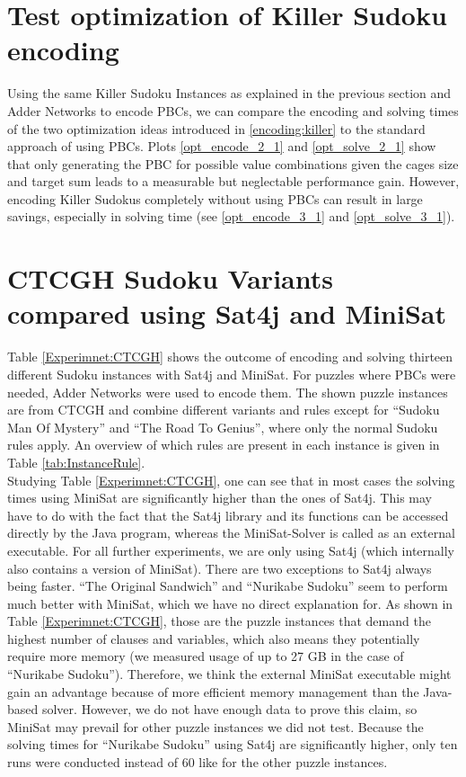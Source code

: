 \section{Test optimization of Killer Sudoku encoding}
Using the same Killer Sudoku Instances as explained in the previous section and Adder Networks to encode PBCs, we can compare the encoding and solving times of the two optimization ideas introduced in \ref{encoding:killer} to the standard approach of using PBCs. Plots \ref{opt_encode_2_1} and \ref{opt_solve_2_1} show that only generating the PBC for possible value combinations given the cages size and target sum leads to a measurable but neglectable performance gain. However, encoding Killer Sudokus completely without using PBCs can result in large savings, especially in solving time (see \ref{opt_encode_3_1} and \ref{opt_solve_3_1}).

\section{CTCGH Sudoku Variants compared using Sat4j and MiniSat}
Table \ref{Experimnet:CTCGH} shows the  outcome of encoding and solving thirteen different Sudoku instances with Sat4j and MiniSat. For puzzles where PBCs were needed, Adder Networks were used to encode them. The shown puzzle instances are from CTCGH and combine different variants and rules except for ``Sudoku Man Of Mystery'' and ``The Road To Genius'', where only the normal Sudoku rules apply. An overview of which rules are present in each instance is given in Table \ref{tab:InstanceRule}.\\

Studying Table \ref{Experimnet:CTCGH}, one can see that in most cases the solving times using MiniSat are significantly higher than the ones of Sat4j. This may have to do with the fact that the Sat4j library and its functions can be accessed directly by the Java program, whereas the MiniSat-Solver is called as an external executable. For all further experiments, we are only using Sat4j (which internally also contains a version of MiniSat). There are two exceptions to Sat4j always being faster. ``The Original Sandwich'' and ``Nurikabe Sudoku'' seem to perform much better with MiniSat, which we have no direct explanation for. As shown in Table \ref{Experimnet:CTCGH}, those are the puzzle instances that demand the highest number of clauses and variables, which also means they potentially require more memory (we measured usage of up to 27 GB in the case of ``Nurikabe Sudoku''). Therefore, we think the external MiniSat executable might gain an advantage because of more efficient memory management than the Java-based solver. However, we do not have enough data to prove this claim, so MiniSat may prevail for other puzzle instances we did not test. Because the solving times for ``Nurikabe Sudoku'' using Sat4j are significantly higher, only ten runs were conducted instead of 60 like for the other puzzle instances.\\

